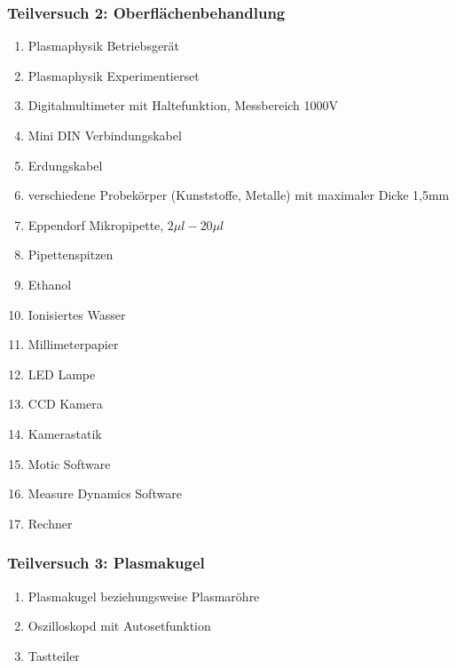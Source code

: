 \documentclass{article}
\begin{document}
    \subsubsection{Teilversuch 2: Oberflächenbehandlung}
        \begin{enumerate}[label=\arabic*.]
            \item Plasmaphysik Betriebsgerät
            \item Plasmaphysik Experimentierset
            \item Digitalmultimeter mit Haltefunktion, Messbereich 1000V
            \item Mini DIN Verbindungskabel
            \item Erdungskabel
            \item verschiedene Probekörper (Kunststoffe, Metalle) mit maximaler Dicke 1,5mm
            \item Eppendorf Mikropipette, $2\mu l-20\mu l$
            \item Pipettenspitzen
            \item Ethanol
            \item Ionisiertes Wasser
            \item Millimeterpapier
            \item LED Lampe
            \item CCD Kamera
            \item Kamerastatik
            \item Motic Software
            \item Measure Dynamics Software
            \item Rechner
        \end{enumerate}
    \subsubsection{Teilversuch 3: Plasmakugel}
        \begin{enumerate}[label=\arabic*.]
            \item Plasmakugel beziehungsweise Plasmaröhre
            \item Oszilloskopd mit Autosetfunktion
            \item Tastteiler
        \end{enumerate}

\newpage
\end{document}
